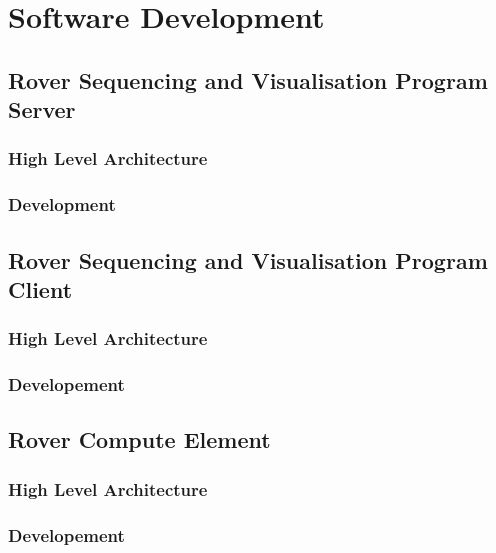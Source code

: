 \section{Software Development}  
  \subsection{Rover Sequencing and Visualisation Program Server}
    \subsubsection{High Level Architecture}
    \subsubsection{Development}
    
  \subsection{Rover Sequencing and Visualisation Program Client}
    \subsubsection{High Level Architecture}
    \subsubsection{Developement}
    
  \subsection{Rover Compute Element}
    \subsubsection{High Level Architecture}
    \subsubsection{Developement}
    